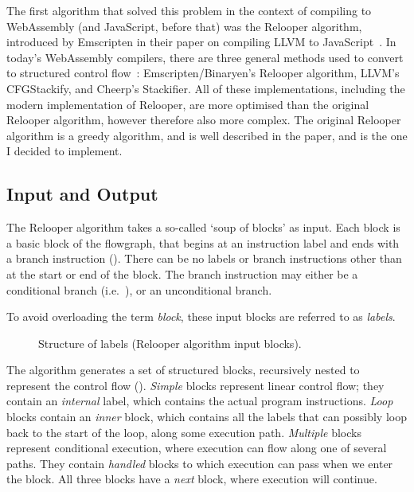\documentclass[00-main.tex]{subfiles}
\begin{document}
The first algorithm that solved this problem in the context of compiling to WebAssembly (and JavaScript, before that) was the Relooper algorithm, introduced by Emscripten in their paper on compiling LLVM to JavaScript~.
In today's WebAssembly compilers, there are three general methods used to convert to structured control flow~: Emscripten/Binaryen's Relooper algorithm, LLVM's CFGStackify, and Cheerp's Stackifier.
All of these implementations, including the modern implementation of Relooper, are more optimised than the original Relooper algorithm, however therefore also more complex.
The original Relooper algorithm is a greedy algorithm, and is well described in the paper, and is the one I decided to implement.

\subsection{Input and Output}

The Relooper algorithm takes a so-called `soup of blocks' as input.
Each block is a basic block of the flowgraph, that begins at an instruction label and ends with a branch instruction ().
There can be no labels or branch instructions other than at the start or end of the block.
The branch instruction may either be a conditional branch (i.e.\ ), or an unconditional branch.

To avoid overloading the term \emph{block}, these input blocks are referred to as \emph{labels}.


\begin{figure}[t]
  \centering
  \caption{Structure of labels (Relooper algorithm input blocks).}
  \label{fig:relooper input label structure} %
\end{figure}

The algorithm generates a set of structured blocks, recursively nested to represent the control flow ().
\emph{Simple} blocks represent linear control flow; they contain an \emph{internal} label, which contains the actual program instructions.
\emph{Loop} blocks contain an \emph{inner} block, which contains all the labels that can possibly loop back to the start of the loop, along some execution path.
\emph{Multiple} blocks represent conditional execution, where execution can flow along one of several paths.
They contain \emph{handled} blocks to which execution can pass when we enter the block.
All three blocks have a \emph{next} block, where execution will continue.
\end{document}
